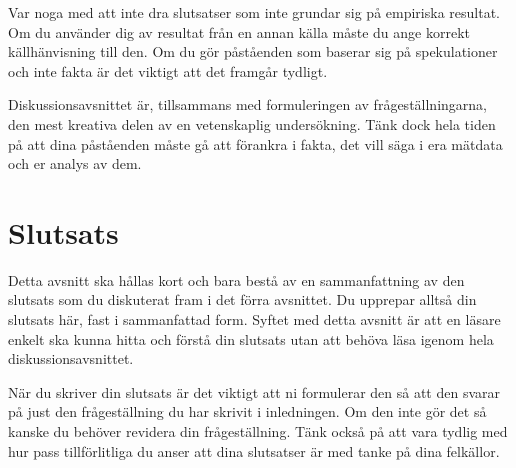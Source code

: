 \documentclass{article}
\begin{document}
Var noga med att inte dra slutsatser som inte grundar sig på empiriska resultat. Om du använder dig av resultat från en annan källa måste du ange korrekt källhänvisning till den. Om du gör påståenden som baserar sig på spekulationer och inte fakta är det viktigt att det framgår tydligt.

Diskussionsavsnittet är, tillsammans med formuleringen av frågeställningarna, den mest kreativa delen av en vetenskaplig undersökning. Tänk dock hela tiden på att dina påståenden måste gå att förankra i fakta, det vill säga i era mätdata och er analys av dem.

\section{Slutsats}
Detta avsnitt ska hållas kort och bara bestå av en sammanfattning av den slutsats som du diskuterat fram i det förra avsnittet. Du upprepar alltså din slutsats här, fast i sammanfattad form. Syftet med detta avsnitt är att en läsare enkelt ska kunna hitta och förstå din slutsats utan att behöva läsa igenom hela diskussionsavsnittet.

När du skriver din slutsats är det viktigt att ni formulerar den så att den svarar på just den frågeställning du har skrivit i inledningen. Om den inte gör det så kanske du behöver revidera din frågeställning. Tänk också på att vara tydlig med hur pass tillförlitliga du anser att dina slutsatser är med tanke på dina felkällor.
\clearpage
~\cite{wiki:graf}
~\cite{wiki:set}
{}

\end{document}
